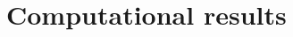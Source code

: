 \documentclass[preprint,12pt]{elsarticle}
\begin{document}
\section{Computational results}
\label{sec:numerical results}
\end{document}
